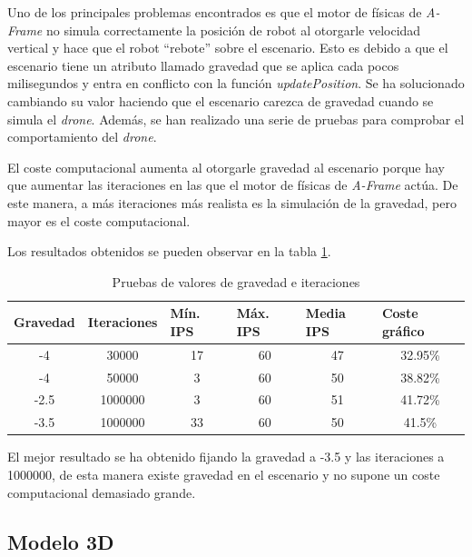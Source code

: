 Uno de los principales problemas encontrados es que el motor de físicas de \textit{A-Frame} no simula correctamente la posición de robot al otorgarle velocidad vertical y hace que el robot ``rebote'' sobre el escenario. Esto es debido a que el escenario tiene un atributo llamado gravedad que se aplica cada pocos milisegundos y entra en conflicto con la función \textit{updatePosition}. Se ha solucionado cambiando su valor haciendo que el escenario carezca de gravedad cuando se simula el \textit{drone}. Además, se han realizado una serie de pruebas para comprobar el comportamiento del \textit{drone}. \newline

El coste computacional aumenta al otorgarle gravedad al escenario porque hay que aumentar las iteraciones en las que el motor de físicas de \textit{A-Frame} actúa. De este manera, a más iteraciones más realista es la simulación de la gravedad, pero mayor es el coste computacional.

Los resultados obtenidos se pueden observar en la tabla \ref{tab:tablaGravedad}.

\begin{table}[H]
\caption{Pruebas de valores de gravedad e iteraciones}
\centering
\label{tab:tablaGravedad}
\begin{tabular}{|c|c|c|c|c|c|}
\hline
\multicolumn{1}{|l|}{\textbf{Gravedad}} & \multicolumn{1}{l|}{\textbf{Iteraciones}} & \multicolumn{1}{l|}{\textbf{Mín. IPS}} & \multicolumn{1}{l|}{\textbf{Máx. IPS}} & \multicolumn{1}{l|}{\textbf{Media IPS}} & \multicolumn{1}{l|}{\textbf{Coste gráfico}} \\ \hline
-4 & 30000 & 17 & 60 & 47 & 32.95\% \\ \hline
-4 & 50000 & 3 & 60 & 50 & 38.82\% \\ \hline
-2.5 & 1000000 & 3 & 60 & 51 & 41.72\% \\ \hline
-3.5 & 1000000 & 33 & 60 & 50 & 41.5\% \\ \hline
\end{tabular}
\end{table}

El mejor resultado se ha obtenido fijando la gravedad a -3.5 y las iteraciones a 1000000, de esta manera existe gravedad en el escenario y no supone un coste computacional demasiado grande. 


\subsection{Modelo 3D}


